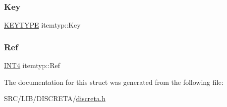 \mbox{\label{structitemtyp_a23d7614c31c36eb13c0cef225d10ee93}} 
\subsubsection{\texorpdfstring{Key}{Key}}
{\footnotesize\ttfamily \mbox{\hyperlink{discreta_8h_a535c8df88e5939fd8a1a3d083e75124a}{K\+E\+Y\+T\+Y\+PE}} itemtyp\+::\+Key}

\mbox{\label{structitemtyp_a41c0d1fa23bad826e5d72a5b85ebd323}} 
\subsubsection{\texorpdfstring{Ref}{Ref}}
{\footnotesize\ttfamily \mbox{\hyperlink{galois_8h_a6675ac57b948be915e03c09228b57b05}{I\+N\+T4}} itemtyp\+::\+Ref}



The documentation for this struct was generated from the following file\+:\begin{DoxyCompactItemize}
\item 
S\+R\+C/\+L\+I\+B/\+D\+I\+S\+C\+R\+E\+T\+A/\mbox{\hyperlink{discreta_8h}{discreta.\+h}}\end{DoxyCompactItemize}
